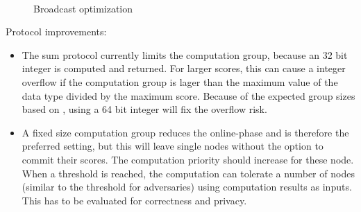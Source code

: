 \begin{figure}[!htb] %
	\centering
	\\
	\caption{Broadcast optimization} \label{figure:broadcast optimization}
\end{figure}
 
Protocol improvements:
\begin{itemize}
	\item The sum protocol currently limits the computation group, because an 32 bit integer is computed and returned. For larger scores, this can cause a integer overflow if the computation group is lager than the maximum value of the data type divided by the maximum score. Because of the expected group sizes based on , using a 64 bit integer will fix the overflow risk.
	\item A fixed size computation group reduces the online-phase and is therefore the preferred setting, but this will leave single nodes without the option to commit their scores. The computation priority should increase for these node. When a threshold is reached, the computation can tolerate a number of nodes (similar to the threshold for adversaries) using computation results as inputs. This has to be evaluated for correctness and privacy.
\end{itemize}

